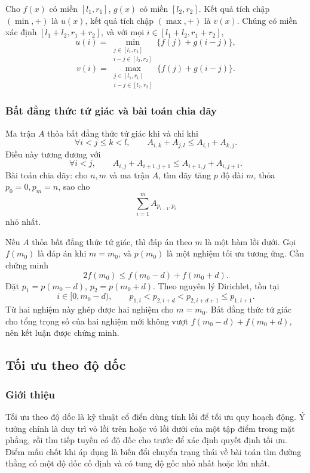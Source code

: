 \documentclass[11pt]{article}
\begin{document}
Cho \(f(x)\) có miền \([l_1,r_1]\), \(g(x)\) có miền \([l_2,r_2]\). Kết quả
tích chập \((\min,+)\) là \(u(x)\), kết quả tích chập \((\max,+)\) là \(v(x)\).
Chúng có miền xác định \([l_1+l_2,r_1+r_2]\), và với mọi
\(i\in[l_1+l_2,r_1+r_2]\),
\[
  u(i)=\min_{\substack{j\in[l_1,r_1]\\ i-j\in[l_2,r_2]}}
  \{f(j)+g(i-j)\},
\]
\[
  v(i)=\max_{\substack{j\in[l_1,r_1]\\ i-j\in[l_2,r_2]}}
  \{f(j)+g(i-j)\}.
\]

\subsubsection{Bất đẳng thức tứ giác và bài toán chia dãy}

Ma trận \(A\) thỏa bất đẳng thức tứ giác khi và chỉ khi
\[
  \forall i<j\le k<l,\qquad
  A_{i,k}+A_{j,l}\le A_{i,l}+A_{k,j}.
\]
Điều này tương đương với
\[
  \forall i<j,\qquad
  A_{i,j}+A_{i+1,j+1}\le A_{i+1,j}+A_{i,j+1}.
\]
Bài toán chia dãy: cho \(n,m\) và ma trận \(A\), tìm dãy tăng \(p\) độ dài
\(m\), thỏa \(p_0=0,p_m=n\), sao cho
\[
  \sum_{i=1}^m A_{p_{i-1},p_i}
\]
nhỏ nhất.

Nếu \(A\) thỏa bất đẳng thức tứ giác, thì đáp án theo \(m\) là một hàm lồi
dưới. Gọi \(f(m_0)\) là đáp án khi \(m=m_0\), và \(p(m_0)\) là một nghiệm tối
ưu tương ứng. Cần chứng minh
\[
  2f(m_0)\le f(m_0-d)+f(m_0+d).
\]
Đặt \(p_1=p(m_0-d)\), \(p_2=p(m_0+d)\). Theo nguyên lý Dirichlet, tồn tại
\[
  i\in[0,m_0-d),\qquad
  p_{1,i}<p_{2,i+d}<p_{2,i+d+1}\le p_{1,i+1}.
\]
Từ hai nghiệm này ghép được hai nghiệm cho \(m=m_0\). Bất đẳng thức tứ giác
cho tổng trọng số của hai nghiệm mới không vượt
\(f(m_0-d)+f(m_0+d)\), nên kết luận được chứng minh.

\subsection{Tối ưu theo độ dốc}

\subsubsection{Giới thiệu}

Tối ưu theo độ dốc là kỹ thuật cổ điển dùng tính lồi để tối ưu quy hoạch động.
Ý tưởng chính là duy trì vỏ lồi trên hoặc vỏ lồi dưới của một tập điểm trong
mặt phẳng, rồi tìm tiếp tuyến có độ dốc cho trước để xác định quyết định tối
ưu. Điểm mấu chốt khi áp dụng là biến đổi chuyển trạng thái về bài toán tìm
đường thẳng có một độ dốc cố định và có tung độ gốc nhỏ nhất hoặc lớn nhất.
\end{document}
